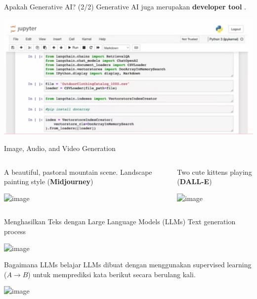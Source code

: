 \documentclass[pdf]{beamer}
\theoremstyle{mystyle}
\begin{document}
\begin{frame}{Apakah Generative AI? (2/2)}
	Generative AI juga merupakan \textbf{developer tool} \citep{ng2023generative}.
	\begin{center}
		\includegraphics[scale=.25]{images/generative-developer-tool.png}
	\end{center}
\end{frame}

\begin{frame}{Image, Audio, and Video Generation}
	\begin{columns}
		\begin{column}{.5\textwidth}
			A beautiful, pastoral mountain scene. Landscape painting style (\textbf{Midjourney})
			\begin{center}
				\includegraphics<2->[scale=.25]{images/contoh-midjourney.png}
			\end{center}
		\end{column}
		\begin{column}{.5\textwidth}
	\onslide<3->Two cute kittens playing (\textbf{DALL-E})
	\begin{center}
		\includegraphics<4->[scale=.25]{images/contoh-dall-e.png}
	\end{center}
\end{column}		
	\end{columns}
\end{frame}	

\begin{frame}{Menghasilkan Teks dengan Large Language Models (LLMs)}
	Text generation process \citep{ng2023generative}
	
	\begin{center}
		\includegraphics<2->[scale=.25]{images/prompt-and-llm.png}
	\end{center}
\end{frame}

\begin{frame}{Bagaimana LLMs belajar}
	LLMs dibuat dengan menggunakan supervised learning ($A \rightarrow B$) untuk memprediksi kata berikut secara berulang kali.
	
	\begin{center}
		\includegraphics<2->[scale=.25]{images/tabel-next-word.png}
	\end{center}
	
\end{frame}
\end{document}
